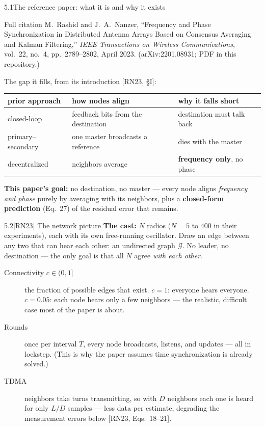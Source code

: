 \documentclass[10pt]{beamer}
\newcommand{\RN}[1]{\textcolor{blue!50!black}{[RN23#1]}}
\newcommand{\srcline}[1]{\par\vfill\noindent{\tiny\textcolor{gray}{Source: #1}}}
\begin{document}
\begin{frame}{5.1\quad The reference paper: what it is and why it exists}
\begin{block}{Full citation}
M.~Rashid and J.~A.~Nanzer, ``Frequency and Phase Synchronization in
Distributed Antenna Arrays Based on Consensus Averaging and Kalman
Filtering,'' \emph{IEEE Transactions on Wireless Communications},
vol.~22, no.~4, pp.~2789--2802, April 2023. (arXiv:2201.08931; PDF in
this repository.)
\end{block}
The gap it fills, from its introduction \RN{, \S I}:
\begin{center}
\small
\begin{tabular}{lll}
\toprule
prior approach & how nodes align & why it falls short\\
\midrule
closed-loop & feedback bits from the destination & destination must talk back\\
primary--secondary & one master broadcasts a reference & dies with the master\\
decentralized & neighbors average & \textbf{frequency only}, no phase\\
\bottomrule
\end{tabular}
\end{center}
\vspace{1ex}
\textbf{This paper's goal:} no destination, no master --- every node
aligns \emph{frequency and phase} purely by averaging with its
neighbors, plus a \textbf{closed-form prediction} (Eq.~27) of the
residual error that remains.
\end{frame}

\begin{frame}{5.2\quad \RN{} The network picture}
\textbf{The cast:} $N$ radios ($N=5$ to 400 in their experiments), each
with its own free-running oscillator. Draw an edge between any two that
can hear each other: an undirected graph $\mathcal G$. No leader, no
destination --- the only goal is that all $N$ agree \emph{with each
other}.
\vspace{1ex}
\begin{description}
\item[{Connectivity $c\in(0,1]$}] the fraction of possible edges that
exist. $c=1$: everyone hears everyone. $c=0.05$: each node hears only a
few neighbors --- the realistic, difficult case most of the paper is
about.
\item[Rounds] once per interval $T$, every node broadcasts, listens,
and updates --- all in lockstep. (This is why the paper assumes time
synchronization is already solved.)
\item[TDMA] neighbors take turns transmitting, so with $D$ neighbors
each one is heard for only $L/D$ samples --- less data per estimate,
degrading the measurement errors below \RN{, Eqs.~18--21}.
\end{description}
\srcline{[RN23] \S II--III; their simulation parameters: $f_c=1$\,GHz, $f_s=10$\,MHz, $T=0.1$\,ms, SNR $=0$\,dB.}
\end{frame}
\end{document}
